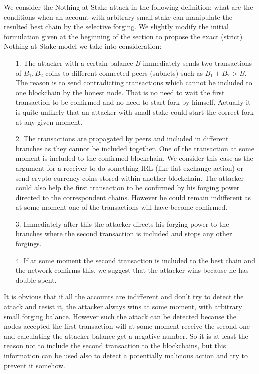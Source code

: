 \documentclass[12pt]{article}
\begin{document}
We consider the Nothing-at-Stake attack in the following definition: what are the conditions when an account with arbitrary small stake can 
manipulate the resulted best chain by the selective forging. We slightly modify the initial formulation given at the beginning of the section to propose the 
exact (strict) Nothing-at-Stake model we take into consideration:
\begin{itemize}
\item[1.] {The attacker with a certain balance $B$ immediately sends two transactions of $B_1,B_2$ coins to different connected peers (subnets) such as $B_1+B_2>B$. 
The reason is to send contradicting transactions which cannot be included to one blockchain by the honest node. That is no need to wait the first transaction to 
be confirmed and no need to start fork by himself. Actually it is quite unlikely that an attacker with small stake could start the correct fork at any given moment.}
\item[2.] {The transactions are propagated by peers and included in different branches as they cannot be included together. One of the 
transaction at some moment is included to the confirmed blockchain. We consider this case as the argument for a receiver to do 
something IRL (like fiat exchange action) or send crypto-currency coins stored within another blockchain. The attacker could also help the first transaction to be
confirmed by his forging power directed to the correspondent chains. However he could remain indifferent as at some moment one of the transactions will have
become confirmed.}
\item[3.] {Immediately after this the attacker directs his forging power to the branches where the second transaction is included and stops any other forgings.}
\item[4.] {If at some moment the second transaction is included to the best chain and the network confirms this, we suggest that the attacker wins because he 
has double spent.}  
\end{itemize}

It is obvious that if all the accounts are indifferent and don't try to detect the attack and resist it, 
the attacker always wins at some moment, with arbitrary small forging balance. However such the attack can be detected because 
the nodes accepted the first transaction will at some moment receive the second one and calculating the attacker balance get a negative number. 
So it is at least the reason not to include the second transaction to the blockchains, but this information can be used also to detect a potentially 
malicious action and try to prevent it somehow.  
\end{document}

